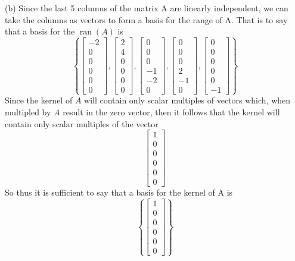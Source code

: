 \documentclass{report}
\begin{document}
(b) Since the last 5 columns of the matrix A are linearly independent, we can take the columns as vectors to form a basis for the range of A. That is to say that a basis for the $\operatorname{ran}(A)$ is
$$
\left\{
\begin{bmatrix} -2 \\ 0 \\ 0 \\ 0 \\ 0 \\ 0 \end{bmatrix},
\begin{bmatrix}  2 \\ 4 \\ 0 \\ 0 \\ 0 \\ 0 \end{bmatrix},
\begin{bmatrix} 0 \\ 0 \\ 0 \\ -1 \\ -2 \\ 0 \end{bmatrix},
\begin{bmatrix} 0 \\ 0 \\ 0 \\ 2 \\ -1 \\ 0 \end{bmatrix},
\begin{bmatrix} 0 \\ 0 \\ 0 \\ 0 \\ 0 \\ -1 \end{bmatrix}
\right\}
$$
Since the kernel of $A$ will contain only scalar multiples of vectors which, when multipled by $A$ result in the zero vector, then it follows that the kernel will contain only scalar multiples of the vector
$$
\begin{bmatrix} 1 \\ 0 \\ 0 \\ 0 \\ 0 \\ 0 \end{bmatrix}
$$
So thus it is sufficient to say that a basis for the kernel of A is
$$
\left\{\begin{bmatrix} 1 \\ 0 \\ 0 \\ 0 \\ 0 \\ 0 \end{bmatrix}\right\}
$$
\end{document}
